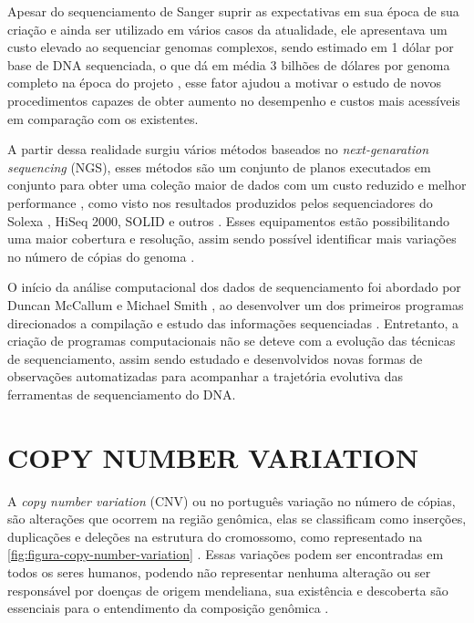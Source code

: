 Apesar do sequenciamento de Sanger suprir as expectativas em sua época de sua criação e ainda ser utilizado em vários casos da atualidade, ele apresentava um custo elevado ao sequenciar genomas complexos, sendo estimado em 1 dólar por base de DNA sequenciada, o que dá em média 3 bilhões de dólares por genoma completo na época do projeto \cite{HutchisonIII2007}, esse fator ajudou a motivar o estudo de novos procedimentos capazes de obter aumento no desempenho e custos mais acessíveis em comparação com os existentes. 

A partir dessa realidade surgiu vários métodos baseados no \textit{next-genaration sequencing} (NGS), esses métodos são um conjunto de planos executados em conjunto para obter uma coleção maior de dados com um custo reduzido e melhor performance \cite{Metzker2010,Zhao2013}, como visto nos resultados produzidos pelos sequenciadores do Solexa \cite{Bennett2004}, HiSeq 2000, SOLID e outros \cite{Edwards2011,Linnarsson2010}. Esses equipamentos estão possibilitando uma maior cobertura e resolução, assim sendo possível identificar mais variações no número de cópias do genoma \cite{Zhao2013}. 


O início da análise computacional dos dados de sequenciamento foi abordado por Duncan McCallum e Michael Smith \cite{McCallum1977}, ao desenvolver um dos primeiros programas direcionados a compilação e estudo das informações sequenciadas \cite{HutchisonIII2007}. Entretanto, a criação de programas computacionais não se deteve com a evolução das técnicas de sequenciamento, assim sendo estudado e desenvolvidos novas formas de observações automatizadas para acompanhar a trajetória evolutiva das ferramentas de sequenciamento do DNA. 


\section{COPY NUMBER VARIATION} 
\label{sec:copyNumberVariation}

A \textit{copy number variation} (CNV) ou no português variação no número de cópias, são alterações que ocorrem na região genômica, elas se classificam como inserções, duplicações e deleções na estrutura do cromossomo, como representado na \autoref{fig:figura-copy-number-variation} \cite{Zhao2013,Redon2006}. Essas variações podem ser encontradas em todos os seres humanos, podendo não representar nenhuma alteração ou ser responsável por doenças de origem mendeliana, sua existência e descoberta são essenciais para o entendimento da composição genômica \cite{Redon2006,Feuk2006}.

